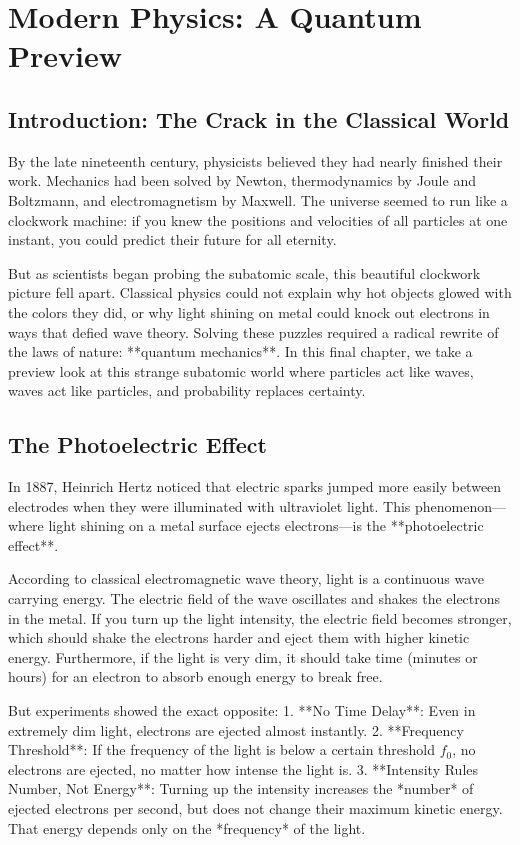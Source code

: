 \chapter{Modern Physics: A Quantum Preview}

\section{Introduction: The Crack in the Classical World}

By the late nineteenth century, physicists believed they had nearly finished their work. Mechanics had been solved by Newton, thermodynamics by Joule and Boltzmann, and electromagnetism by Maxwell. The universe seemed to run like a clockwork machine: if you knew the positions and velocities of all particles at one instant, you could predict their future for all eternity. 

But as scientists began probing the subatomic scale, this beautiful clockwork picture fell apart. Classical physics could not explain why hot objects glowed with the colors they did, or why light shining on metal could knock out electrons in ways that defied wave theory. Solving these puzzles required a radical rewrite of the laws of nature: **quantum mechanics**. In this final chapter, we take a preview look at this strange subatomic world where particles act like waves, waves act like particles, and probability replaces certainty.

\section{The Photoelectric Effect}

In 1887, Heinrich Hertz noticed that electric sparks jumped more easily between electrodes when they were illuminated with ultraviolet light. This phenomenon—where light shining on a metal surface ejects electrons—is the **photoelectric effect**.

According to classical electromagnetic wave theory, light is a continuous wave carrying energy. The electric field of the wave oscillates and shakes the electrons in the metal. If you turn up the light intensity, the electric field becomes stronger, which should shake the electrons harder and eject them with higher kinetic energy. Furthermore, if the light is very dim, it should take time (minutes or hours) for an electron to absorb enough energy to break free.

But experiments showed the exact opposite:
1. **No Time Delay**: Even in extremely dim light, electrons are ejected almost instantly.
2. **Frequency Threshold**: If the frequency of the light is below a certain threshold $f_0$, no electrons are ejected, no matter how intense the light is.
3. **Intensity Rules Number, Not Energy**: Turning up the intensity increases the *number* of ejected electrons per second, but does not change their maximum kinetic energy. That energy depends only on the *frequency* of the light.

